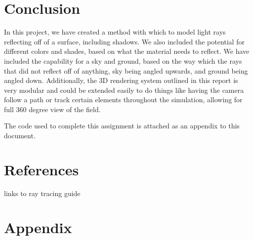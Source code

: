 \documentclass{article}
\begin{document}
\section{Conclusion}
In this project, we have created a method with which to model light rays reflecting off of a surface, including shadows. We also
included the potential for different colors and shades, based on what the material needs to reflect. We have included the capability
for a sky and ground, based on the way which the rays that did not reflect off of anything, sky being angled upwards, and ground
being angled down. Additionally, the 3D rendering system outlined in this report is very modular and could be extended easily to
do things like having the camera follow a path or track certain elements throughout the simulation, allowing for full 360 degree
view of the field.

The code used to complete this assignment is attached as an appendix to this document.

\section{References}
links to ray tracing guide


\newpage
\onecolumn
\section{Appendix}



\end{document}
